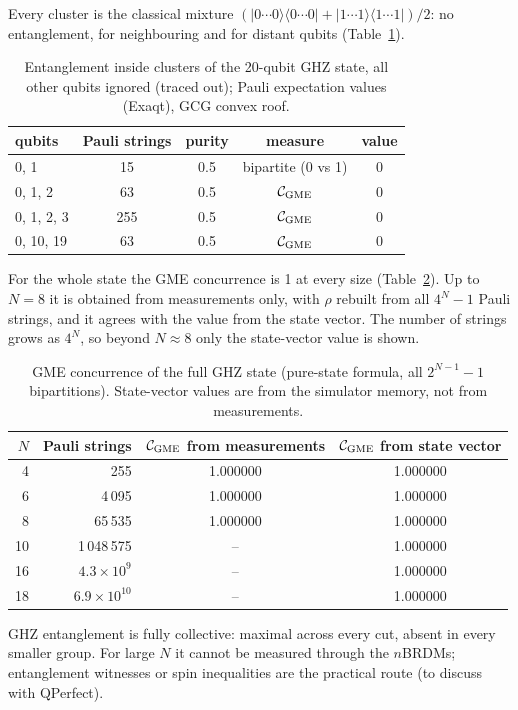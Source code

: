\documentclass[11pt,a4paper]{article}
\begin{document}
Every cluster is the classical mixture
$(|0\cdots0\rangle\langle0\cdots0| + |1\cdots1\rangle\langle1\cdots1|)/2$: no entanglement,
for neighbouring and for distant qubits (Table~\ref{tab:clusters}).

\begin{table}[h!]
\centering
\small
\begin{tabular}{lcccc}
  \toprule
  qubits & Pauli strings & purity & measure & value \\
  \midrule
  0, 1           & 15  & 0.5 & bipartite (0 vs 1)         & 0 \\
  0, 1, 2        & 63  & 0.5 & $\mathcal{C}_{\rm GME}$    & 0 \\
  0, 1, 2, 3     & 255 & 0.5 & $\mathcal{C}_{\rm GME}$    & 0 \\
  0, 10, 19      & 63  & 0.5 & $\mathcal{C}_{\rm GME}$    & 0 \\
  \bottomrule
\end{tabular}
\caption{Entanglement inside clusters of the 20-qubit GHZ state, all other qubits
ignored (traced out); Pauli expectation values (Exaqt), GCG convex roof.}
\label{tab:clusters}
\end{table}

For the whole state the GME concurrence is 1 at every size (Table~\ref{tab:full}). Up to
$N = 8$ it is obtained from measurements only, with $\rho$ rebuilt from all $4^N-1$ Pauli
strings, and it agrees with the value from the state vector. The number of strings grows as
$4^N$, so beyond $N \approx 8$ only the state-vector value is shown.

\begin{table}[h!]
\centering
\small
\begin{tabular}{rrcc}
  \toprule
  $N$ & Pauli strings & $\mathcal{C}_{\rm GME}$ from measurements & $\mathcal{C}_{\rm GME}$ from state vector \\
  \midrule
   4 &           255 & 1.000000 & 1.000000 \\
   6 &         4\,095 & 1.000000 & 1.000000 \\
   8 &        65\,535 & 1.000000 & 1.000000 \\
  10 &     1\,048\,575 & --       & 1.000000 \\
  16 & $4.3\times10^{9}$  & --  & 1.000000 \\
  18 & $6.9\times10^{10}$ & --  & 1.000000 \\
  \bottomrule
\end{tabular}
\caption{GME concurrence of the full GHZ state (pure-state formula, all $2^{N-1}-1$
bipartitions). State-vector values are from the simulator memory, not from measurements.}
\label{tab:full}
\end{table}

GHZ entanglement is fully collective: maximal across every cut, absent in every
smaller group. For large $N$ it cannot be measured through the $n$BRDMs; entanglement
witnesses or spin inequalities are the practical route (to discuss with QPerfect).
\end{document}
